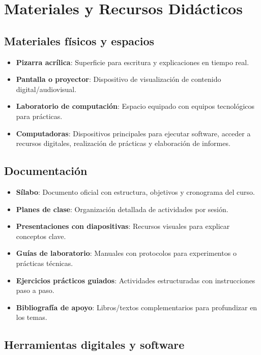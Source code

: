 \section{Materiales y Recursos Didácticos}

\subsection*{Materiales físicos y espacios}

\begin{itemize}
    \item \textbf{Pizarra acrílica}: Superficie para escritura y explicaciones en tiempo real.
    \item \textbf{Pantalla o proyector}: Dispositivo de visualización de contenido digital/audiovisual.
    \item \textbf{Laboratorio de computación}: Espacio equipado con equipos tecnológicos para prácticas.
    \item \textbf{Computadoras}: Dispositivos principales para ejecutar software, acceder a recursos digitales, realización de prácticas y elaboración de informes.
\end{itemize}

\subsection*{Documentación}

\begin{itemize}
    \item \textbf{Sílabo}: Documento oficial con estructura, objetivos y cronograma del curso.
    \item \textbf{Planes de clase}: Organización detallada de actividades por sesión.
    \item \textbf{Presentaciones con diapositivas}: Recursos visuales para explicar conceptos clave.
    \item \textbf{Guías de laboratorio}: Manuales con protocolos para experimentos o prácticas técnicas.
    \item \textbf{Ejercicios prácticos guiados}: Actividades estructuradas con instrucciones paso a paso.
    \item \textbf{Bibliografía de apoyo}: Libros/textos complementarios para profundizar en los temas.
\end{itemize}

\subsection*{Herramientas digitales y software}

